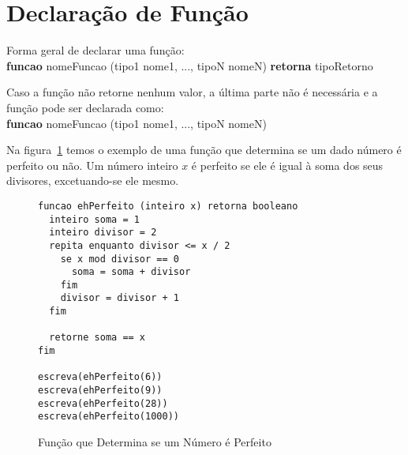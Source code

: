 \documentclass{report}
\begin{document}
\section{Declaração de Função}

Forma geral de declarar uma função: \\
\textbf{funcao} nomeFuncao (tipo1 nome1, ..., tipoN nomeN) \textbf{retorna} tipoRetorno

Caso a função não retorne nenhum valor, a última parte não é necessária e a
função pode ser declarada como: \\
\textbf{funcao} nomeFuncao (tipo1 nome1, ..., tipoN nomeN)


Na figura~\ref{fig:perfeito} temos o exemplo de uma função que
determina se um dado número é perfeito ou não. Um número inteiro
$x$ é perfeito se ele é igual à soma dos seus divisores, excetuando-se
ele mesmo. 

\begin{figure}
\begin{verbatim}
funcao ehPerfeito (inteiro x) retorna booleano
  inteiro soma = 1
  inteiro divisor = 2
  repita enquanto divisor <= x / 2
    se x mod divisor == 0
      soma = soma + divisor
    fim
    divisor = divisor + 1
  fim	

  retorne soma == x
fim

escreva(ehPerfeito(6))
escreva(ehPerfeito(9))
escreva(ehPerfeito(28))
escreva(ehPerfeito(1000))
\end{verbatim}
\caption{Função que Determina se um Número é Perfeito}
\label{fig:perfeito}
\end{figure}
\end{document}
